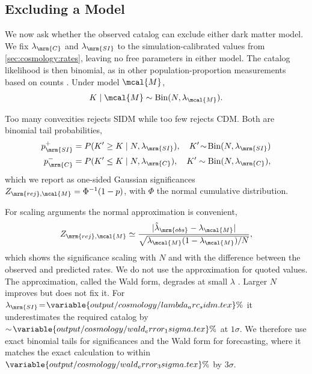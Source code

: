 \documentclass[linenumbers,twocolumn]{aastex701}
\newcommand{\lamM}{\ensuremath{\lambda_{\mcal{M}}}}   %
\newcommand{\lamC}{\ensuremath{\lambda_{\mrm{C}}}}    %
\newcommand{\lamSI}{\ensuremath{\lambda_{\mrm{SI}}}}  %
\newcommand{\lamObs}{\ensuremath{\hat{\lambda}_{\mrm{obs}}}}  %
\begin{document}

    \subsection{Excluding a Model}\label{sec:cosmology:excluded}

        We now ask whether the observed catalog can exclude either dark matter model. %
        We fix $\lamC$ and $\lamSI$ to the simulation-calibrated values from \autoref{sec:cosmology:rates}, leaving no free parameters in either model. %
        The catalog likelihood is then binomial, as in other population-proportion measurements based on counts \citep{Cameron:2011:EstimationConfidenceIntervals}. %
        Under model $\mcal{M}$,
        \begin{equation}\label{eq:cosmology:binom}
            K \mid \mcal{M} \sim \mathrm{Bin}(N,\lamM).
        \end{equation}

        Too many convexities rejects \gls{SIDM} while too few rejects \gls{CDM}. %
        Both are binomial tail probabilities, %
        \begin{align}
            p_{\mrm{SI}}^{+} &= P(K'\ge K\mid N,\lamSI),
                \quad
                K'\!\sim\!\mathrm{Bin}(N,\lamSI) \label{eq:cosmology:p_reject_sidm}
            \\
            p_{\mrm{C}}^{-} &= P(K'\le K\mid N,\lamC),
                \quad
                K'\sim\mathrm{Bin}(N,\lamC), \label{eq:cosmology:p_reject_cdm}
        \end{align}
        which we report as one-sided Gaussian significances $Z_{\mrm{rej},\mcal{M}} = \Phi^{-1}(1-p)$, with $\Phi$ the normal cumulative distribution. %

        For scaling arguments the normal approximation is convenient, %
        \begin{equation}\label{eq:cosmology:one_sided_rejection}
            Z_{\mrm{rej},\mcal{M}}
            \simeq \frac{|\lamObs - \lamM|}{\sqrt{\lamM (1 - \lamM)/N}},
        \end{equation}
        which shows the significance scaling with $N$ and with the difference between the observed and predicted rates. %
        We do not use the approximation for quoted values. %
        The approximation, called the Wald form, degrades at small $\lambda$ \citep{Brown+:2002:ConfidenceIntervalsBinomial,Cameron:2011:EstimationConfidenceIntervals}. %
        Larger $N$ improves but does not fix it. %
        For $\lamSI\!=\!\variable{output/cosmology/lambda_arc_sidm.tex}\%$ it underestimates the required catalog by $\sim\!\variable{output/cosmology/wald_error_1sigma.tex}\%$ at $1\sigma$. %
        We therefore use exact binomial tails for significances and the Wald form for forecasting, where it matches the exact calculation to within $\variable{output/cosmology/wald_error_3sigma.tex}\%$ by $3\sigma$. %
\end{document}
